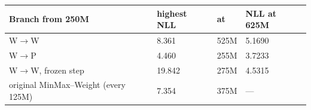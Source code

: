 \begin{tabular}{@{}llll@{}}
\toprule
Branch from 250M & highest NLL & at & NLL at 625M \\
\midrule
W$\to$W & 8.361 & 525M & 5.1690 \\
W$\to$P & 4.460 & 255M & 3.7233 \\
W$\to$W, frozen step & 19.842 & 275M & 4.5315 \\
original MinMax--Weight (every 125M) & 7.354 & 375M & --- \\
\bottomrule
\end{tabular}
